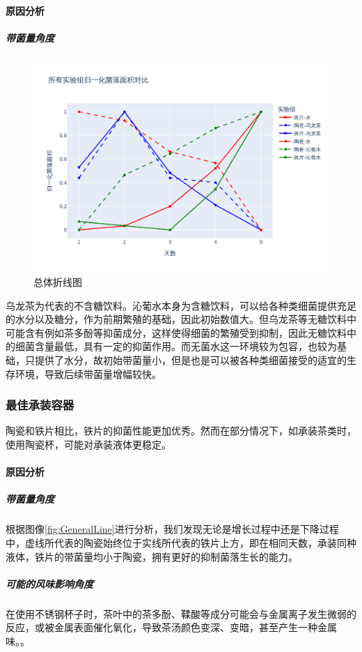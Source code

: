 \documentclass[12pt,a4paper]{ctexart}
\begin{document}
\paragraph{原因分析}
\subparagraph{带菌量角度}
\begin{figure}[H]  %
    \centering  %
    \includegraphics[width=\textwidth]{./plot/General/combined_normalized_line.png}  %
    \caption{总体折线图}  %
    \label{fig:GeneralLineFront}  %
\end{figure}
乌龙茶为代表的不含糖饮料。沁葡水本身为含糖饮料，可以给各种类细菌提供充足的水分以及糖分，作为前期繁殖的基础，因此初始数值大。但乌龙茶等无糖饮料中可能含有例如茶多酚等抑菌成分，这样使得细菌的繁殖受到抑制，因此无糖饮料中的细菌含量最低，具有一定的抑菌作用。而无菌水这一环境较为包容，也较为基础，只提供了水分，故初始带菌量小，但是也是可以被各种类细菌接受的适宜的生存环境，导致后续带菌量增幅较快。

\subsubsection{最佳承装容器}
陶瓷和铁片相比，铁片的抑菌性能更加优秀。然而在部分情况下，如承装茶类时，使用陶瓷杯，可能对承装液体更稳定。

\paragraph{原因分析}
\subparagraph{带菌量角度}
根据图像\ref{fig:GeneralLine}进行分析，我们发现无论是增长过程中还是下降过程中，虚线所代表的陶瓷始终位于实线所代表的铁片上方，即在相同天数，承装同种液体，铁片的带菌量均小于陶瓷，拥有更好的抑制菌落生长的能力。
\subparagraph{可能的风味影响角度}
在使用不锈钢杯子时，茶叶中的茶多酚、鞣酸等成分可能会与金属离子发生微弱的反应，或被金属表面催化氧化，导致茶汤颜色变深、变暗，甚至产生一种金属味。\cite{JSHJ201504002}。
\end{document}
